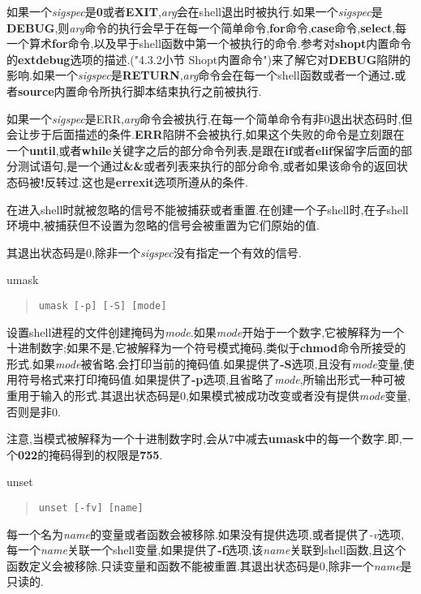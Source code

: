\documentclass[draft,openany]{book}
\begin{document}
\begin{CJK}{UTF8}{gbsn}
\begin{basedescript}{\desclabelstyle{\nextlinelabel}\desclabelwidth{2.5em}}
            如果一个\emph{sigspec}是\textbf{0}或者\textbf{EXIT},\emph{arg}会在shell退出时被执行.如果一个\emph{sigspec}是\textbf{DEBUG},则\emph{arg}命令的执行会早于在每一个简单命令,\textbf{for}命令,\textbf{case}命令,\textbf{select},每一个算术\textbf{for}命令,以及早于shell函数中第一个被执行的命令.参考对\textbf{shopt}内置命令的\textbf{extdebug}选项的描述.("4.3.2小节 Shopt内置命令")来了解它对\textbf{DEBUG}陷阱的影响.如果一个\emph{sigspec}是\textbf{RETURN},\emph{arg}命令会在每一个shell函数或者一个通过\textbf{.}或者\textbf{source}内置命令所执行脚本结束执行之前被执行.\par
            如果一个\emph{sigspec}是ERR,\emph{arg}命令会被执行,在每一个简单命令有非0退出状态码时,但会让步于后面描述的条件.\textbf{ERR}陷阱不会被执行,如果这个失败的命令是立刻跟在一个\textbf{until},或者\textbf{while}关键字之后的部分命令列表,是跟在\textbf{if}或者\textbf{elif}保留字后面的部分测试语句,是一个通过\textbf{\&\&}或者\textbf{\textbar\textbar}列表来执行的部分命令,或者如果该命令的返回状态码被\textbf{!}反转过.这也是\textbf{errexit}选项所遵从的条件.\par
            在进入shell时就被忽略的信号不能被捕获或者重置.在创建一个子shell时,在子shell环境中,被捕获但不设置为忽略的信号会被重置为它们原始的值.\par
            其退出状态码是0,除非一个\emph{sigspec}没有指定一个有效的信号.
        \item[umask]
            \begin{quote}
                \verb+umask [-p] [-S] [mode]+
            \end{quote}
            设置shell进程的文件创建掩码为\emph{mode}.如果\emph{mode}开始于一个数字,它被解释为一个十进制数字;如果不是,它被解释为一个符号模式掩码,类似于\textbf{chmod}命令所接受的形式.如果\emph{mode}被省略.会打印当前的掩码值.如果提供了\textbf{-S}选项,且没有\emph{mode}变量,使用符号格式来打印掩码值.如果提供了\textbf{-p}选项,且省略了\emph{mode},所输出形式一种可被重用于输入的形式.其退出状态码是0,如果模式被成功改变或者没有提供\emph{mode}变量,否则是非0.\par
            注意,当模式被解释为一个十进制数字时,会从7中减去\textbf{umask}中的每一个数字.即,一个\textbf{022}的掩码得到的权限是\textbf{755}.
        \item[unset]
            \begin{quote}
                \verb+unset [-fv] [name]+
            \end{quote}
            每一个名为\emph{name}的变量或者函数会被移除.如果没有提供选项,或者提供了\emph{-v}选项,每一个\emph{name}关联一个shell变量,如果提供了\textbf{-f}选项,该\emph{name}关联到shell函数,且这个函数定义会被移除.只读变量和函数不能被重置.其退出状态码是0,除非一个\emph{name}是只读的.
    \end{basedescript}


\end{CJK}
\end{document}
